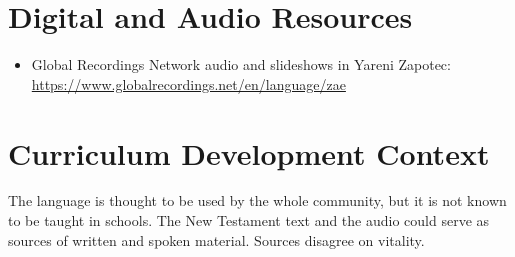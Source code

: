 \documentclass[12pt]{article}
\begin{document}
\section{Digital and Audio Resources}
\begin{itemize}
\item Global Recordings Network audio and slideshows in Yareni Zapotec: \url{https://www.globalrecordings.net/en/language/zae}
\end{itemize}

\section{Curriculum Development Context}
The language is thought to be used by the whole community, but it is not known to be taught in schools. The New Testament text and the audio could serve as sources of written and spoken material. Sources disagree on vitality.
\end{document}
